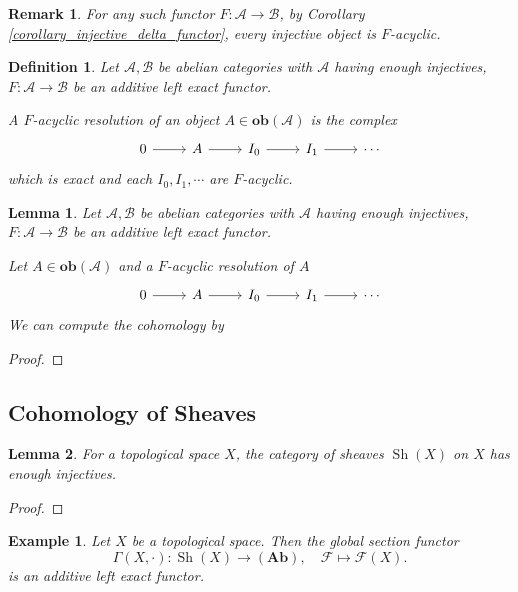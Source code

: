 \documentclass{article}
\newtheorem{definition}{Definition}[section]
\newtheorem{lemma}{Lemma}[section]
\newtheorem{remark}{Remark}[section]
\newtheorem{example}{Example}[section]
\numberwithin{equation}{section}
\DeclareMathOperator{\Sh}{Sh}
\begin{document}
\begin{remark}
For any such functor $F:\mathscr{A}\to\mathscr{B}$, by Corollary \ref{corollary_injective_delta_functor}, every injective object is  $F$-acyclic.
\end{remark}

\begin{definition}
Let $\mathscr{A},\mathscr{B}$ be abelian categories with $\mathscr{A}$ having enough injectives, $F:\mathscr{A}\to\mathscr{B}$ be an additive left exact functor. \\
\par A $F$-acyclic resolution of an object $A\in\mathbf{ob}(\mathscr{A})$ is the complex
\[
\begin{tikzcd}
0\arrow[r]&A\arrow[r]&I_0\arrow[r]&I_1\arrow[r]&\cdots
\end{tikzcd}
\]
which is exact and each $I_0,I_1,\cdots$ are $F$-acyclic. 
\end{definition}

\begin{lemma}
Let $\mathscr{A},\mathscr{B}$ be abelian categories with $\mathscr{A}$ having enough injectives, $F:\mathscr{A}\to\mathscr{B}$ be an additive left exact functor.\\
\par Let $A\in\mathbf{ob}(\mathscr{A})$ and a $F$-acyclic resolution of $A$
\[
\begin{tikzcd}
0\arrow[r]&A\arrow[r]&I_0\arrow[r]&I_1\arrow[r]&\cdots
\end{tikzcd}
\]
We can compute the cohomology by %
\end{lemma}

\begin{proof}
\end{proof}

\subsection{Cohomology of Sheaves}

\begin{lemma}
For a topological space $X$, the category of sheaves $\Sh(X)$ on $X$ has enough injectives.
\end{lemma}

\begin{proof}
\end{proof}

\begin{example}
Let $X$ be a topological space. Then the global section functor
\begin{equation*}
\Gamma(X,\cdot):\Sh(X)\to(\mathbf{Ab}), \quad \mathcal{F}\mapsto \mathcal{F}(X).
\end{equation*}
is an additive left exact functor. %
\end{example}
\end{document}
